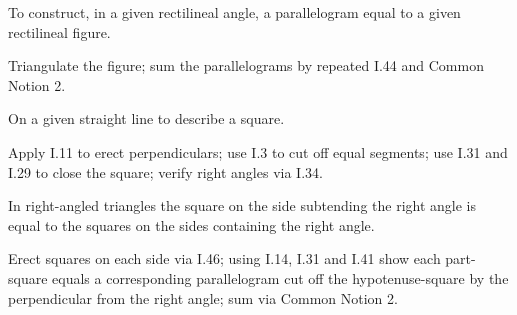 \documentclass{rrxiv}
\begin{document}
\begin{claim}
\label{prop:I.45}
To construct, in a given rectilineal angle, a parallelogram equal to
a given rectilineal figure.
\end{claim}
\begin{evidence}[Proof of I.45]
\label{ev:I.45}
Triangulate the figure; sum the parallelograms by repeated I.44 and
Common Notion 2.
\end{evidence}

\begin{claim}
\label{prop:I.46}
On a given straight line to describe a square.
\end{claim}
\begin{evidence}[Proof of I.46]
\label{ev:I.46}
Apply I.11 to erect perpendiculars; use I.3 to cut off equal segments;
use I.31 and I.29 to close the square; verify right angles via I.34.
\end{evidence}

\begin{claim}
\label{prop:I.47}
In right-angled triangles the square on the side subtending the right
angle is equal to the squares on the sides containing the right angle.
\end{claim}
\begin{evidence}[Proof of I.47]

\label{ev:I.47}
Erect squares on each side via I.46; using I.14, I.31 and I.41 show
each part-square equals a corresponding parallelogram cut off the
hypotenuse-square by the perpendicular from the right angle; sum via
Common Notion 2.
\end{evidence}
\end{document}
